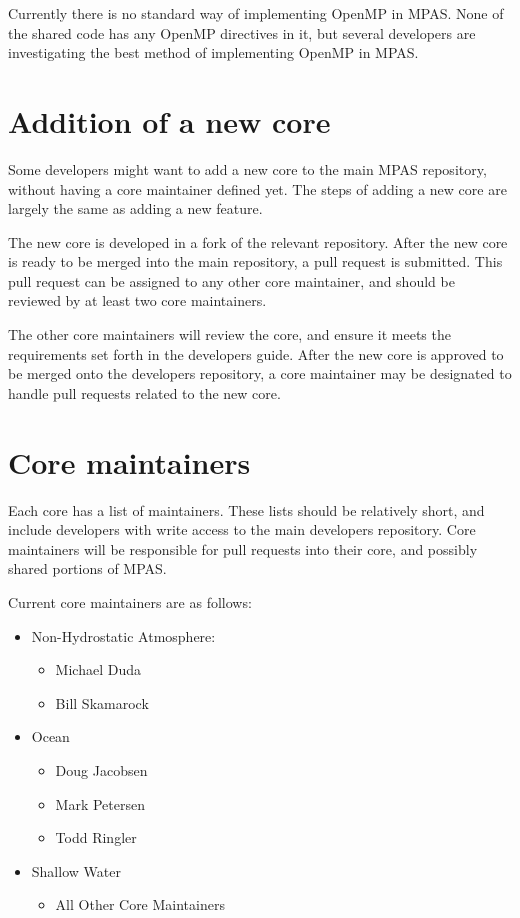 \documentclass[11pt]{report}
\begin{document}
Currently there is no standard way of implementing OpenMP in MPAS. None of the
shared code has any OpenMP directives in it, but several developers are
investigating the best method of implementing OpenMP in MPAS.

\chapter{Addition of a new core}
Some developers might want to add a new core to the main MPAS repository,
without having a core maintainer defined yet. The steps of adding a new core
are largely the same as adding a new feature. 

The new core is developed in a fork of the relevant repository. After the new
core is ready to be merged into the main repository, a pull request is
submitted. This pull request can be assigned to any other core maintainer, and
should be reviewed by at least two core maintainers.

The other core maintainers will review the core, and ensure it meets the
requirements set forth in the developers guide. After the new core is approved
to be merged onto the developers repository, a core maintainer may be
designated to handle pull requests related to the new core.


\chapter{Core maintainers}
Each core has a list of maintainers. These lists should be relatively short,
and include developers with write access to the main developers repository.
Core maintainers will be responsible for pull requests into their core, and
possibly shared portions of MPAS. 

Current core maintainers are as follows:
\begin{itemize}
	\item Non-Hydrostatic Atmosphere:
		\begin{itemize}
			\item Michael Duda
			\item Bill Skamarock
		\end{itemize}
	\item Ocean
		\begin{itemize}
			\item Doug Jacobsen
			\item Mark Petersen
			\item Todd Ringler
		\end{itemize}
	\item Shallow Water
		\begin{itemize}
			\item All Other Core Maintainers
		\end{itemize}
\end{itemize}
\end{document}

